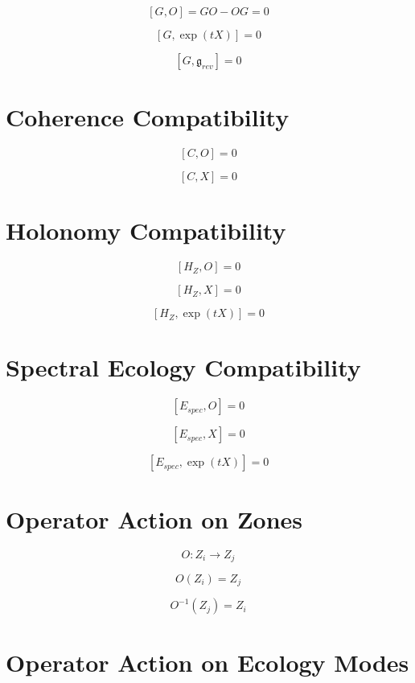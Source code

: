 \[
[G, O] = GO - OG = 0
\]

\[
[G, \exp(tX)] = 0
\]

\[
[G, \mathfrak{g}_{rev}] = 0
\]


\section*{Coherence Compatibility}

\[
[C, O] = 0
\]

\[
[C, X] = 0
\]


\section*{Holonomy Compatibility}

\[
[H_Z, O] = 0
\]

\[
[H_Z, X] = 0
\]

\[
[H_Z, \exp(tX)] = 0
\]


\section*{Spectral Ecology Compatibility}

\[
[E_{spec}, O] = 0
\]

\[
[E_{spec}, X] = 0
\]

\[
[E_{spec}, \exp(tX)] = 0
\]


\section*{Operator Action on Zones}

\[
O : Z_i \to Z_j
\]

\[
O(Z_i) = Z_j
\]

\[
O^{-1}(Z_j) = Z_i
\]


\section*{Operator Action on Ecology Modes}

